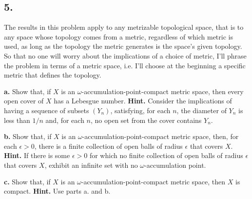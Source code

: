 \documentclass{amsart}
\theoremstyle{plain}
\theoremstyle{definition}
\theoremstyle{remark}
\begin{document}
\vspace{.15in}
\noindent
\subsection*{5.} The results in this problem apply to any metrizable topological space, that is to any space whose topology comes from a metric, regardless of which metric is used, as long as the topology the metric generates is the space's given topology. So that no one will worry about the implications of a choice of metric, I'll phrase the problem in terms of a metric space, i.e. I'll choose at the beginning a specific metric that defines the topology.  

\vspace{.1in}
\noindent
{\bfseries a.} Show that, if $X$ is an $\omega$-accumulation-point-compact metric space, then every open cover of $X$ has a Lebesgue number. {\bfseries Hint.} Consider the implications of having a sequence of subsets $(Y_n)$, satisfying, for each $n$, the diameter of $Y_n$ is less than $1/n$ and, for each $n$, no open set from the cover contains $Y_n$.  

\vspace{.1in}
\noindent
{\bfseries b.} Show that, if $X$ is an $\omega$-accumulation-point-compact metric space, then, for each $\epsilon > 0$, there is a finite collection of open balls of radius $\epsilon$ that covers $X$. {\bfseries Hint.} If there is some $\epsilon > 0$ for which no finite collection of open balls of radius $\epsilon$ that covers $X$, exhibit an infinite set with no $\omega$-accumulation point.

\vspace{.1in}
\noindent
{\bfseries c.} Show that, if $X$ is an $\omega$-accumulation-point-compact metric space, then $X$ is compact. {\bfseries Hint.} Use parts a. and b. 


 
\end{document}
